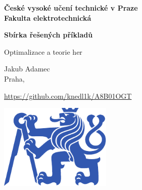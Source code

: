 \documentclass[11pt,a4paper]{article}
\begin{document}
\pgfplotsset{compat=1.18}
 

\begin{titlepage}
    \centering
    \vspace*{2cm}

    {\Large \textbf{České vysoké učení technické v Praze}\\}
    \vspace{0.2cm}
    {\Large \textbf{Fakulta elektrotechnická}\\}
    
    \vspace{1cm}
    {\Huge \textbf{Sbírka řešených příkladů}\\}

    \vspace{0.5cm}
    {\Large Optimalizace a teorie her\\}

    \vspace{2cm}
    { Jakub Adamec\\}
    { Praha, \the\year\\}

    \vspace{2cm}
    { \url{https://github.com/knedl1k/A8B01OGT}}

    \vspace{2cm}
    \includegraphics[width=0.4\textwidth]{media/symbol_cvut_plna_samostatna_verze_Pantone.pdf}

    \vfill
    
\end{titlepage}

\clearpage
{}
\setcounter{page}{1}

\tableofcontents
{}

\clearpage
{}
\setcounter{page}{1} 





 
\end{document}
